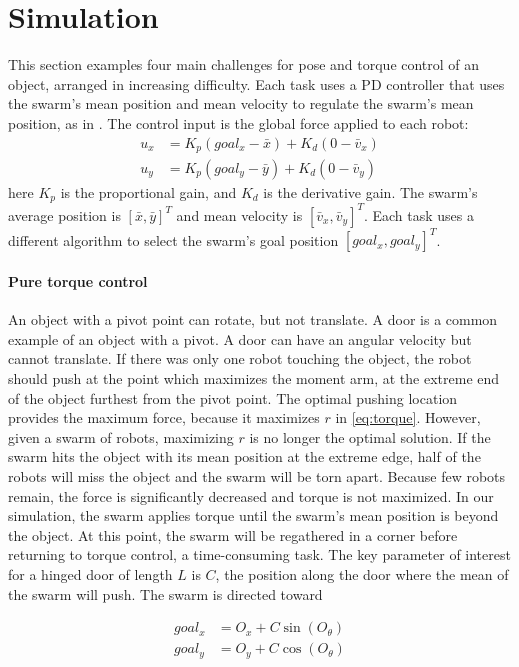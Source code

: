 
\section{Simulation}\label{sec:simulation}
This section examples four main challenges for pose and torque control of an object, arranged in increasing difficulty.  Each task uses a PD controller that uses the swarm's mean position and mean velocity to regulate the swarm's mean position,  as in \cite{ShahrokhiIROS2015}. The control input is the global force applied to each robot:
\begin{align}
u_x &= K_{p}(goal_x - \bar{x}) + K_{d}(0-\bar{v}_x) \nonumber\\
u_y &= K_{p}(goal_y  - \bar{y}) + K_{d}(0-\bar{v}_y)  \label{eq:PDcontrolPosition}
\end{align}
here $K_{p}$ is the proportional gain, and $K_{d}$ is the derivative gain.  
The swarm's average position is $[\bar{x},\bar{y}]^T$ and mean velocity is $[\bar{v}_x,\bar{v}_y]^T$.  
Each task uses a different algorithm to select the swarm's goal position $[goal_x,goal_y]^T$.

\paragraph{Pure torque control} \label{sec:simulationPureTorque}
An object with a pivot point can rotate, but not translate. A door is a common example of an object with a pivot. A door can have an angular velocity but cannot translate. 
 If there was only one robot touching the object, the robot should push at the point which maximizes the moment arm, at the extreme end of the object furthest from the pivot point.
The optimal pushing location provides the maximum force, because it maximizes  $r$ in \eqref{eq:torque}.
However, given a swarm of robots, maximizing $r$ is no longer the optimal solution.  
If the swarm hits the object with its mean position at the extreme edge, half of the robots will miss the object and  the swarm will be torn apart.
Because few robots remain,  the force is significantly decreased and torque is not maximized.
 In our simulation, the swarm applies torque until the swarm's mean position is beyond the object.  At this point, the swarm will be regathered in a corner before returning to torque control, a time-consuming task. 
 The key parameter of interest for a hinged door of length $L$ is $C$, the position along the door where the mean of the swarm will push.  The swarm is directed toward 
 
\begin{align}\nonumber
goal_x &= O_x + C \sin(O_{\theta}) \\
goal_y &= O_y + C \cos(O_{\theta})  \label{eq:TorqueControl}
\end{align}

